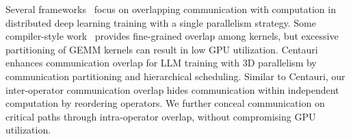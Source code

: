  Several frameworks~\cite{hashemi2019tictac, li2020pytorch, mahajan2023better, peng2019generic, pytorch_fsdp} focus on overlapping communication with computation in distributed deep learning training with a single parallelism strategy. Some compiler-style work~\cite{jangda2022breaking, wang2022overlap, pati2024t3} provides fine-grained overlap among kernels, but excessive partitioning of GEMM kernels can result in low GPU utilization. Centauri~\cite{chen2024centauri} enhances communication overlap for LLM training with 3D parallelism by communication partitioning and hierarchical scheduling. Similar to Centauri, our inter-operator communication overlap hides communication within independent computation by reordering operators. We further conceal communication on critical paths through intra-operator overlap, without compromising GPU utilization. 

